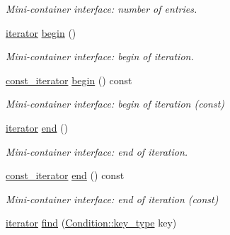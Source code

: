 \begin{DoxyCompactItemize}
\begin{DoxyCompactList}\small\item\em Mini-\/container interface\+: number of entries. \end{DoxyCompactList}\item 
\hyperlink{class_d_d4hep_1_1_conditions_1_1_conditions_dependency_collection_a685a1a6841f2fa4d70ab9a9bfb7b0b6a}{iterator} \hyperlink{class_d_d4hep_1_1_conditions_1_1_conditions_dependency_collection_a975ac1f54aa844d4ae3c3e15f70bfdaa}{begin} ()
\begin{DoxyCompactList}\small\item\em Mini-\/container interface\+: begin of iteration. \end{DoxyCompactList}\item 
\hyperlink{class_d_d4hep_1_1_conditions_1_1_conditions_dependency_collection_ab5e9bcdc3330c3b694303f627799dc84}{const\+\_\+iterator} \hyperlink{class_d_d4hep_1_1_conditions_1_1_conditions_dependency_collection_af54639de86e7de644ba5f4d50cf4a02a}{begin} () const
\begin{DoxyCompactList}\small\item\em Mini-\/container interface\+: begin of iteration (const) \end{DoxyCompactList}\item 
\hyperlink{class_d_d4hep_1_1_conditions_1_1_conditions_dependency_collection_a685a1a6841f2fa4d70ab9a9bfb7b0b6a}{iterator} \hyperlink{class_d_d4hep_1_1_conditions_1_1_conditions_dependency_collection_a6c3a1c17490c6e6f1eece6b9fe3b0db9}{end} ()
\begin{DoxyCompactList}\small\item\em Mini-\/container interface\+: end of iteration. \end{DoxyCompactList}\item 
\hyperlink{class_d_d4hep_1_1_conditions_1_1_conditions_dependency_collection_ab5e9bcdc3330c3b694303f627799dc84}{const\+\_\+iterator} \hyperlink{class_d_d4hep_1_1_conditions_1_1_conditions_dependency_collection_ade5b4e11a1192ba13058c01ef7347526}{end} () const
\begin{DoxyCompactList}\small\item\em Mini-\/container interface\+: end of iteration (const) \end{DoxyCompactList}\item 
\hyperlink{class_d_d4hep_1_1_conditions_1_1_conditions_dependency_collection_a685a1a6841f2fa4d70ab9a9bfb7b0b6a}{iterator} \hyperlink{class_d_d4hep_1_1_conditions_1_1_conditions_dependency_collection_aa1ab8e6418ce818e247ac52baf25bf5e}{find} (\hyperlink{class_d_d4hep_1_1_conditions_1_1_condition_a7528efa762e8cc072ef80ea67c3531f9}{Condition\+::key\+\_\+type} key)

\end{DoxyCompactItemize}
